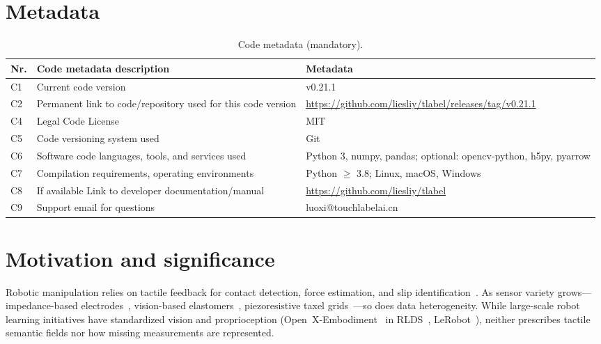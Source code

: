 \documentclass[preprint,12pt,a4paper]{elsarticle}
\begin{document}
\section*{Metadata}
\begin{table}[!h]
\begin{tabular}{|l|p{6.5cm}|p{6.5cm}|}
\hline
\textbf{Nr.} & \textbf{Code metadata description} & \textbf{Metadata} \\
\hline
C1 & Current code version & v0.21.1 \\
\hline
C2 & Permanent link to code/repository used for this code version & \url{https://github.com/liesliy/tlabel/releases/tag/v0.21.1} \\
\hline
C4 & Legal Code License & MIT \\
\hline
C5 & Code versioning system used & Git \\
\hline
C6 & Software code languages, tools, and services used & Python 3, numpy, pandas; optional: opencv-python, h5py, pyarrow \\
\hline
C7 & Compilation requirements, operating environments & Python $\geq$ 3.8; Linux, macOS, Windows \\
\hline
C8 & If available Link to developer documentation/manual & \url{https://github.com/liesliy/tlabel} \\
\hline
C9 & Support email for questions & luoxi@touchlabelai.cn \\
\hline
\end{tabular}
\caption{Code metadata (mandatory).}
\label{tab:codeMetadata}
\end{table}

\section{Motivation and significance}
\label{sec:motivation}

Robotic manipulation relies on tactile feedback for contact detection, force estimation, and slip identification~\cite{lambeta2020digit,yuan2017gelsight}. As sensor variety grows---impedance-based electrodes~\cite{syntouch2018biotac}, vision-based elastomers~\cite{yuan2017gelsight}, piezoresistive taxel grids~\cite{paxini2023}---so does data heterogeneity. While large-scale robot learning initiatives have standardized vision and proprioception (Open~X-Embodiment~\cite{openxembodiment} in RLDS~\cite{rlds}, LeRobot~\cite{lerobot,lerobotdocs}), neither prescribes tactile semantic fields nor how missing measurements are represented.
\end{document}
